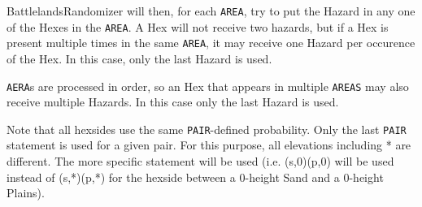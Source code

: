 \documentclass{article}
\begin{document}
BattlelandsRandomizer will then, for each \texttt{AREA}, try to put the
Hazard in any one of the Hexes in the \texttt{AREA}. A Hex will not receive
two hazards, but if a Hex is present multiple times in the same
\texttt{AREA}, it may receive one Hazard per occurence of the Hex. In this
case, only the last Hazard is used.

\texttt{AERA}s are processed in order, so an Hex that appears in multiple
\texttt{AREAS} may also receive multiple Hazards. In this case
only the last Hazard is used.

Note that all hexsides use the same \texttt{PAIR}-defined probability. Only the
last \texttt{PAIR} statement is used for a given pair. For this purpose, all
elevations including * are different. The more specific statement will
be used (i.e. (s,0)(p,0) will be used instead of (s,*)(p,*) for
the hexside between a 0-height Sand and a 0-height Plains).
\end{document}
